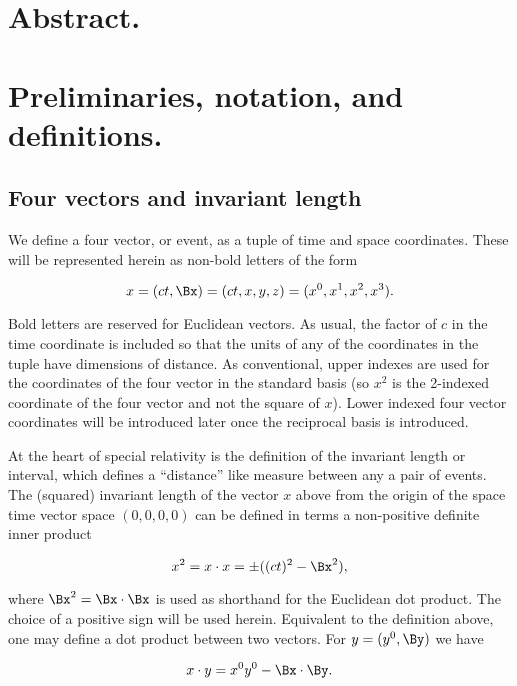 \documentclass[iop,tighten]{emulateapj}
\begin{document}
\section{Abstract.}


\section{Preliminaries, notation, and definitions.}

\subsection{Four vectors and invariant length}

We define a four vector, or event, as a tuple of time and space coordinates.  These will be represented herein as non-bold letters of the form

\begin{equation}\label{eqn:grahamSchmidtLorentz:10}
x = (c t, \Bx) = ( c t, x, y, z ) = ( x^0, x^1, x^2, x^3 ).
\end{equation}

Bold letters are reserved for Euclidean vectors.  As usual, the factor of $c$ in the time coordinate is included so that the units of any of the coordinates in the tuple have dimensions of distance.  As conventional, upper indexes are used for the coordinates of the four vector in the standard basis (so $x^2$ is the 2-indexed coordinate of the four vector and not the square of $x$).  Lower indexed four vector coordinates will be introduced later once the reciprocal basis is introduced.

At the heart of special relativity is the definition of the invariant length or interval, which defines a ``distance'' like measure between any a pair of events.  The (squared) invariant length of the vector $x$ above from the origin of the space time vector space $(0, 0, 0, 0)$ can be defined in terms a non-positive definite inner product

\begin{equation}\label{eqn:grahamSchmidtLorentz:30}
x^2 = x \cdot x = \pm ((c t)^2 - \Bx^2),
\end{equation}

where $\Bx^2 = \Bx \cdot \Bx$ is used as shorthand for the Euclidean dot product.  The choice of a positive sign will be used herein.  Equivalent to the definition above, one may define a dot product between two vectors.  For $y = (y^0, \By)$ we have

\begin{equation}\label{eqn:grahamSchmidtLorentz:50}
x \cdot y = x^0 y^0 - \Bx \cdot \By.
\end{equation}
\end{document}
